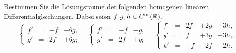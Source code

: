 \documentclass[a4paper, 10pt]{scrartcl}
\begin{document}
\begin{question}
  Bestimmen Sie die Lösungsräume der folgenden homogenen linearen Differentialgleichungen.
  Dabei seien $f, g, h \in C^\infty(\mathbb{R})$.
  \[
    \left\{
      \begin{array}{ccrr}
        f'  & = & -f  & - 6g, \\
        g'  & = & 2f  & + 6g;
      \end{array}
    \right.
    \quad
    \left\{
      \begin{array}{ccrr}
        f'  & = & -f  & - g,  \\
        g'  & = & 2f  & + g;
      \end{array}
    \right.
    \quad
    \left\{
      \begin{array}{ccrrr}
        f'  & = & 2f  & + 2g  & + 3h, \\
        g'  & = &  f  & + 3g  & + 3h, \\
        h'  & = & -f  & - 2f  & - 2h.
      \end{array}
    \right.
  \]
\end{question}
\end{document}
